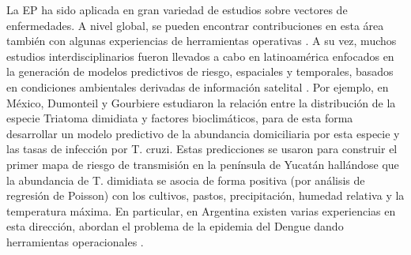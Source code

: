 \par La EP ha sido aplicada en gran variedad de estudios sobre vectores de
  enfermedades. A nivel global, se pueden encontrar contribuciones en esta área
  \cite{herbreteau, kalluri_surveillance, data_driven_prediction} también con
  algunas experiencias de herramientas operativas \cite{bowman_alarm}.
  A su vez, muchos estudios interdisciplinarios fueron llevados a cabo en
  latinoamérica enfocados en la generación de modelos predictivos de riesgo,
  espaciales y temporales, basados en condiciones ambientales derivadas de
  información satelital \cite{enao_gis_y_sr, fuller_costa_rica, madrin_correlating, arboleda_colombia}.
  Por ejemplo, en México, Dumonteil y Gourbiere \cite{mexico}
  estudiaron la relación entre la distribución de la especie Triatoma dimidiata
  y factores bioclimáticos, para de esta forma desarrollar un modelo predictivo de
  la abundancia domiciliaria por esta especie y las tasas de infección
  por T. cruzi. Estas predicciones se usaron para construir el primer mapa de
  riesgo de transmisión en la península de Yucatán hallándose que la abundancia de T.
  dimidiata se asocia de forma positiva (por análisis de regresión de Poisson)
  con los cultivos, pastos, precipitación, humedad relativa y la temperatura
  máxima. En particular, en Argentina existen varias experiencias en esta
  dirección, \cite{rotela_space_time, estallo_prevention, espinosa_temporal} abordan el problema de la epidemia del Dengue dando
  herramientas operacionales \cite{porcasi_operative}.

